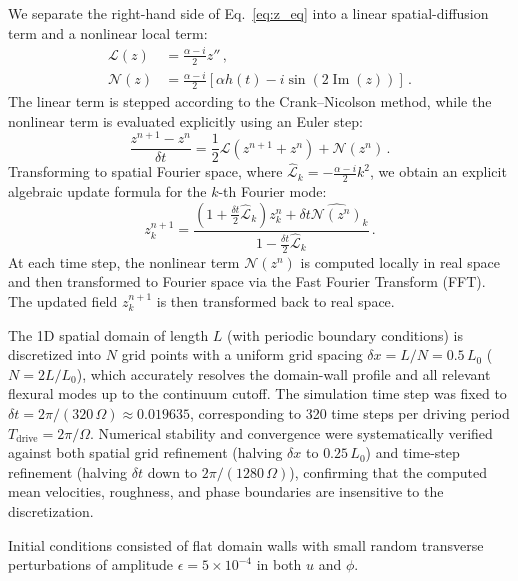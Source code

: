 \documentclass[prb,aps,twocolumn,superscriptaddress,floatfix]{revtex4-2}
\begin{document}
We separate the right-hand side of Eq.~\eqref{eq:z_eq} into a linear spatial-diffusion term and a nonlinear local term:
\begin{align}
    \mathcal L(z) &= \frac{\alpha-i}{2}z'' \, , \label{eq:lin_term}\\
    \mathcal{N}(z)&=\frac{\alpha-i}{2}\left[\alpha h(t)-i\sin\left(2\operatorname{Im}(z)\right)\right]\, . \label{eq:nonlin_term}
\end{align}
The linear term is stepped according to the Crank--Nicolson method, while the nonlinear term is evaluated explicitly using an Euler step:
\begin{equation}
\frac{z^{n+1}-z^{n}}{\delta t}=\frac{1}{2} \mathcal L\left(z^{n+1}+z^{n}\right)+\mathcal N(z^n)\, .
    \label{eq:stepping}
\end{equation}
Transforming to spatial Fourier space, where $\hat{\mathcal{L}}_k = -\frac{\alpha-i}{2}k^2$, we obtain an explicit algebraic update formula for the $k$-th Fourier mode:
\begin{equation}
    z^{n+1}_k=\frac{\left(1+\frac{\delta t}{2}\hat{\mathcal L}_k\right)z_k^n+\delta t \widehat{\mathcal N(z^n)}_k}{1-\frac{\delta t}{2} \hat{\mathcal L}_k} \, .
    \label{eq:fourier_update}
\end{equation}
At each time step, the nonlinear term $\mathcal{N}(z^n)$ is computed locally in real space and then transformed to Fourier space via the Fast Fourier Transform (FFT). The updated field $z_k^{n+1}$ is then transformed back to real space.

The 1D spatial domain of length $L$ (with periodic boundary conditions) is discretized into $N$ grid points with a uniform grid spacing $\delta x = L/N = 0.5\,L_0$ ($N = 2 L/L_0$), which accurately resolves the domain-wall profile and all relevant flexural modes up to the continuum cutoff. The simulation time step was fixed to $\delta t = 2\pi/(320\,\Omega) \approx 0.019635$, corresponding to 320 time steps per driving period $T_\text{drive} = 2\pi/\Omega$. Numerical stability and convergence were systematically verified against both spatial grid refinement (halving $\delta x$ to $0.25\,L_0$) and time-step refinement (halving $\delta t$ down to $2\pi/(1280\,\Omega)$), confirming that the computed mean velocities, roughness, and phase boundaries are insensitive to the discretization.

Initial conditions consisted of flat domain walls with small random transverse perturbations of amplitude $\epsilon = 5\times 10^{-4}$ in both $u$ and $\phi$.
\end{document}
